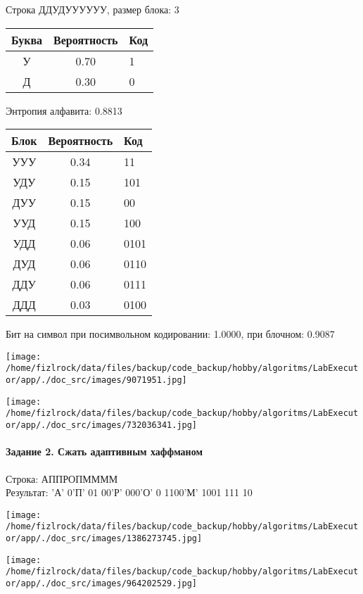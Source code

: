 \documentclass[a4paper, 12pt]{article}
\begin{document}
Строка ДДУДУУУУУУ, размер блока: 3
\begin{center}
 \begin{tabular}{ |c|c|l| } 
  \hline
     Буква & Вероятность & Код\\ \hline
У & 0.70 & 1\\\hline
Д & 0.30 & 0
\\ \hline \end{tabular}
\end{center}
Энтропия алфавита: 0.8813
\begin{center}
 \begin{tabular}{ |c|c|l| } 
  \hline
     Блок & Вероятность & Код\\ \hline
УУУ & 0.34 & 11\\\hline
УДУ & 0.15 & 101\\\hline
ДУУ & 0.15 & 00\\\hline
УУД & 0.15 & 100\\\hline
УДД & 0.06 & 0101\\\hline
ДУД & 0.06 & 0110\\\hline
ДДУ & 0.06 & 0111\\\hline
ДДД & 0.03 & 0100
\\ \hline \end{tabular}
\end{center}
Бит на символ при посимвольном кодировании: 1.0000, при блочном: 0.9087

\texttt{[image: /home/fizlrock/data/files/backup/code\_backup/hobby/algoritms/LabExecutor/app/./doc\_src/images/9071951.jpg]}

\texttt{[image: /home/fizlrock/data/files/backup/code\_backup/hobby/algoritms/LabExecutor/app/./doc\_src/images/732036341.jpg]}
\pagebreak
\paragraph{Задание 2. Сжать адаптивным хаффманом\\}

Строка: 
АППРОПММММ\\
Результат: 'А' 0'П' 01 00'Р' 000'О' 0 1100'М' 1001 111 10

\texttt{[image: /home/fizlrock/data/files/backup/code\_backup/hobby/algoritms/LabExecutor/app/./doc\_src/images/1386273745.jpg]}

\texttt{[image: /home/fizlrock/data/files/backup/code\_backup/hobby/algoritms/LabExecutor/app/./doc\_src/images/964202529.jpg]}
\end{document}
